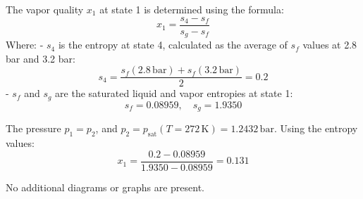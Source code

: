 The vapor quality \( x_1 \) at state 1 is determined using the formula:  
\[
x_1 = \frac{s_4 - s_f}{s_g - s_f}
\]  
Where:  
- \( s_4 \) is the entropy at state 4, calculated as the average of \( s_f \) values at 2.8 bar and 3.2 bar:  
\[
s_4 = \frac{s_f(2.8 \, \text{bar}) + s_f(3.2 \, \text{bar})}{2} = 0.2
\]  
- \( s_f \) and \( s_g \) are the saturated liquid and vapor entropies at state 1:  
\[
s_f = 0.08959, \quad s_g = 1.9350
\]  

The pressure \( p_1 = p_2 \), and \( p_2 = p_{\text{sat}}(T = 272 \, \text{K}) = 1.2432 \, \text{bar} \).  
Using the entropy values:  
\[
x_1 = \frac{0.2 - 0.08959}{1.9350 - 0.08959} = 0.131
\]  

No additional diagrams or graphs are present.